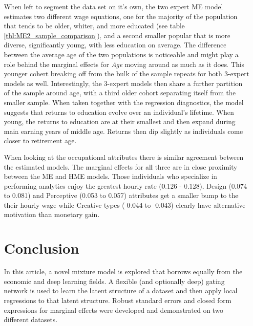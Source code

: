 \documentclass[12pt]{article}
\begin{document}
When left to segment the data set on it's own, the two expert ME model estimates two different
wage equations, one for the majority of the population that tends to be
older, whiter, and more educated (see table \ref{tbl:ME2_sample_comparison}), and a second
smaller popular that is more diverse, significantly young, with less education on average.
The difference between the average age of the two populations is noticeable and
might play a role behind the marginal effects for \textit{Age} moving around as
much as it does. This younger cohert breaking off from the bulk of the sample
repeats for both 3-expert models as well. Interestingly, the 3-expert models then share a
further partition of the sample around age, with a third older cohort separating itself
from the smaller sample. When taken together with the regression diagnostics, the model
suggests that returns to education evolve over an individual's lifetime. When young,
the returns to education are at their smallest and then expand during main earning years
of middle age. Returns then dip slightly as individuals come closer to retirement age.

When looking at the occupational attributes there is similar agreement between
the estimated models. The marginal effects for all three are in close proximity between
the ME and HME models. Those individuals who specialize in performing analytics
enjoy the greatest hourly rate (0.126 - 0.128). Design (0.074 to 0.081) and 
Perceptive (0.053 to 0.057) attributes get a smaller bump to the their hourly
wage while Creative types (-0.044 to -0.043) clearly have alternative motivation than
monetary gain.


\section{Conclusion} \label{sec:Conclusion}

In this article, a novel mixture model is explored that borrows equally from the
economic and deep learning fields. A flexible (and optionally deep) gating network
is used to learn the latent structure of a dataset and then apply local
regressions to that latent structure. Robust standard errors and closed form expressions
for marginal effects were developed and demonstrated on two different datasets. 
\end{document}
